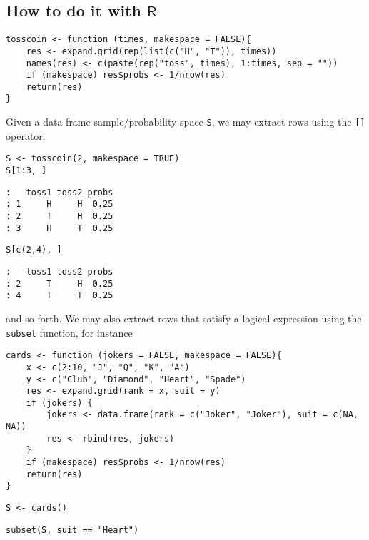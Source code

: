 \subsection{How to do it with \(\mathsf{R}\)}
\label{sec-4-2-1}

\begin{Verbatim}
tosscoin <- function (times, makespace = FALSE){
    res <- expand.grid(rep(list(c("H", "T")), times))
    names(res) <- c(paste(rep("toss", times), 1:times, sep = ""))
    if (makespace) res$probs <- 1/nrow(res)
    return(res)
}
\end{Verbatim}

Given a data frame sample/probability space \texttt{S}, we may extract rows
using the \texttt{[]} operator:

\begin{Verbatim}
S <- tosscoin(2, makespace = TRUE) 
S[1:3, ] 
\end{Verbatim}

\begin{verbatim}
:   toss1 toss2 probs
: 1     H     H  0.25
: 2     T     H  0.25
: 3     H     T  0.25
\end{verbatim}

\begin{Verbatim}
S[c(2,4), ] 
\end{Verbatim}

\begin{verbatim}
:   toss1 toss2 probs
: 2     T     H  0.25
: 4     T     T  0.25
\end{verbatim}

and so forth. We may also extract rows that satisfy a logical
expression using the \texttt{subset} function, for instance

\begin{Verbatim}
cards <- function (jokers = FALSE, makespace = FALSE){
    x <- c(2:10, "J", "Q", "K", "A")
    y <- c("Club", "Diamond", "Heart", "Spade")
    res <- expand.grid(rank = x, suit = y)
    if (jokers) {
        jokers <- data.frame(rank = c("Joker", "Joker"), suit = c(NA, NA))
        res <- rbind(res, jokers)
    }
    if (makespace) res$probs <- 1/nrow(res)
    return(res)
}
\end{Verbatim}

\begin{Verbatim}
S <- cards() 
\end{Verbatim}

\begin{Verbatim}
subset(S, suit == "Heart") 
\end{Verbatim}


